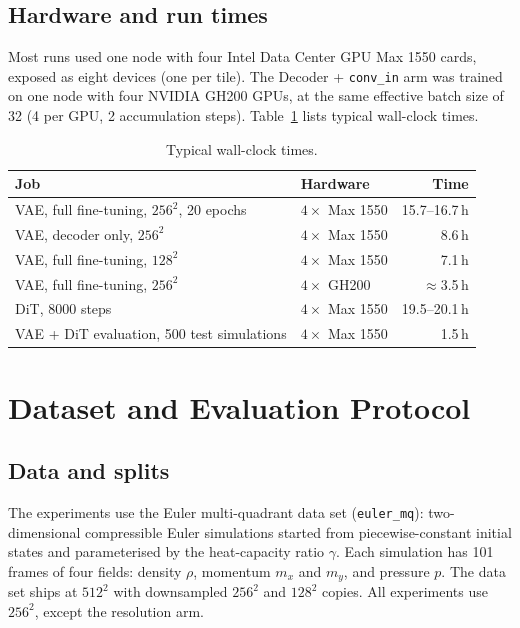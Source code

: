 \section{Hardware and run times}
\label{app:setup_hw}

Most runs used one node with four Intel Data Center GPU Max 1550 cards, exposed
as eight devices (one per tile). The Decoder + \texttt{conv\_in} arm was trained
on one node with four NVIDIA GH200 GPUs, at the same effective batch size of 32
(4 per GPU, 2 accumulation steps). Table~\ref{tab:app_runtime} lists typical
wall-clock times.

\begin{table}[htbp]
\centering
\small
\caption{Typical wall-clock times.}
\label{tab:app_runtime}
\begin{tabular}{llr}
\toprule
Job & Hardware & Time \\
\midrule
VAE, full fine-tuning, $256^2$, 20 epochs & $4\times$ Max 1550 & 15.7--16.7\,h \\
VAE, decoder only, $256^2$ & $4\times$ Max 1550 & 8.6\,h \\
VAE, full fine-tuning, $128^2$ & $4\times$ Max 1550 & 7.1\,h \\
VAE, full fine-tuning, $256^2$ & $4\times$ GH200 & $\approx$3.5\,h \\
DiT, 8000 steps & $4\times$ Max 1550 & 19.5--20.1\,h \\
VAE + DiT evaluation, 500 test simulations & $4\times$ Max 1550 & 1.5\,h \\
\bottomrule
\end{tabular}
\end{table}

\chapter{Dataset and Evaluation Protocol}
\label{app:data}

\section{Data and splits}
\label{app:data_splits}

The experiments use the Euler multi-quadrant data set (\texttt{euler\_mq}):
two-dimensional compressible Euler simulations started from piecewise-constant
initial states and parameterised by the heat-capacity ratio $\gamma$. Each
simulation has 101 frames of four fields: density $\rho$, momentum $m_x$ and
$m_y$, and pressure $p$. The data set ships at $512^2$ with downsampled
$256^2$ and $128^2$ copies. All experiments use $256^2$, except the resolution
arm.

